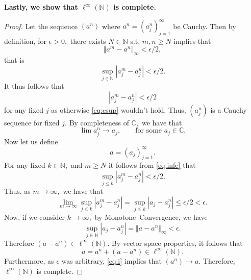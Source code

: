 \documentclass[10pt]{article}
\begin{document}
\noindent
\textbf{Lastly, we show that $\ell^\infty(\mathbb{N})$ is complete.}

\begin{proof}
    Let the sequence $(a^n)$ where $a^n = (a_j^n)_{j=1}^\infty$ be Cauchy. Then by definition, for $\epsilon > 0,$ there exists $N\in\mathbb{N}$ s.t. $m,n\ge N$ implies that
    \begin{equation*}
        \Vert a^m - a^n \Vert_\infty < \epsilon/2,
    \end{equation*}
    that is
    \begin{equation} \label{eq:csup}
        \sup_{j\in\mathbb{N}} |a^m_j-a^n_j| < \epsilon/2.
    \end{equation}
    It thus follows that
    \begin{equation} \label{eq:infe}
        |a_j^m-a^n_j | < \epsilon/2
    \end{equation}
    for any fixed $j$ as otherwise \eqref{eq:csup} wouldn't hold. Thus, $(a_j^n)$ is a Cauchy sequence for fixed $j.$ By completeness of $\mathbb{C},$ we have that
    \begin{equation*}
        \lim a_j^n \to a_j, \qquad\text{for some } a_j\in\mathbb{C}.
    \end{equation*}
    Now let us define
    \[a = (a_j)_{j=1}^\infty.\]
    For any fixed $k\in\mathbb{N},$ and $m\ge N$ it follows from \eqref{eq:infe} that
    \begin{equation*}
        \sup_{j\le k}|a_j^m-a_j^n| < \epsilon/2.
    \end{equation*}
    Thus, as $m\to \infty,$  we have that
    \begin{equation*}
        \lim_{m\to\infty}\sup_{j\le k}|a_j^m-a_j^n|=\sup_{j\le k}|a_j-a_j^n| \le \epsilon/2 < \epsilon.
    \end{equation*}
    Now, if we consider $k\to \infty,$ by Monotone--Convergence, we have
    \begin{equation}\label{eq:i}
        \sup_{j\in\mathbb{N}}|a_j-a_j^n| = \Vert a - a^n \Vert_\infty < \epsilon.
    \end{equation}
    Therefore $(a-a^n)\in\ell^\infty(\mathbb{N}).$ By vector space properties, it follows that
    \[a = a^n + (a-a^n)\in\ell^\infty(\mathbb{N}).\]
    Furthermore, as $\epsilon$ was arbitrary, \eqref{eq:i} implies that $(a^n) \to a.$ Therefore, $\ell^\infty(\mathbb{N})$ is complete.
\end{proof}
\end{document}
